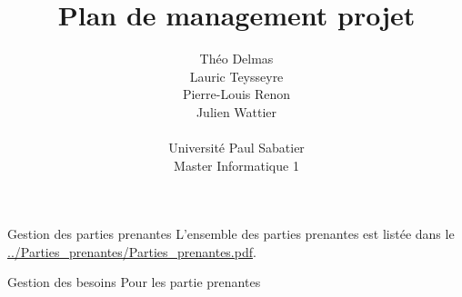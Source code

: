 \documentclass[]{article}
\title{Plan de management projet}
\author{
    Théo Delmas\\
    Lauric Teysseyre\\
    Pierre-Louis Renon\\
    Julien Wattier\\
    \\
    Université Paul Sabatier\\
    Master Informatique 1\\
   }
\date{}
\begin{document}
    \maketitle
    \newpage
    \tableofcontents
    \newpage

    \begin{section}{Gestion des parties prenantes}
        L'ensemble des parties prenantes est listée dans le \url{../Parties_prenantes/Parties_prenantes.pdf}.
    \end{section}

    \begin{section}{Gestion des besoins}
        Pour les partie prenantes 
    \end{section}
\end{document}
